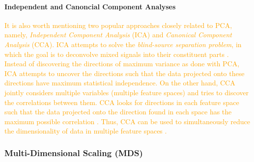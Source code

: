 \paragraph{Independent and Canoncial Component Analyses}
\textcolor{orange}{It is also worth mentioning two popular approaches closely related to PCA, namely, \textit{Independent Component Analysis} (ICA) and \textit{Canonical Component Analysis} (CCA).  ICA attempts to solve the \textit{blind-source separation problem}, in which the goal is to deconvolve mixed signals into their constituent parts \citep{Murphy2012,Hyvarinen2000ICA,Tharwat2018ICATutorial}. Instead of discovering the directions of maximum variance as done with PCA, ICA attempts to uncover the directions such that the data projected onto these directions have maximum statistical independence.  On the other hand, CCA jointly considers multiple variables (multiple feature spaces) and tries to discover the correlations between them.  CCA looks for directions in each feature space such that the data projected onto the direction found in each space has the maximum possible correlation \citep{Bach2005CCA}.  Thus, CCA can be used to simultaneously reduce the dimensionality of data in multiple feature spaces \citep{Murphy2012}.}

\subsubsection{Multi-Dimensional Scaling (MDS)} \label{sec:MDS}

